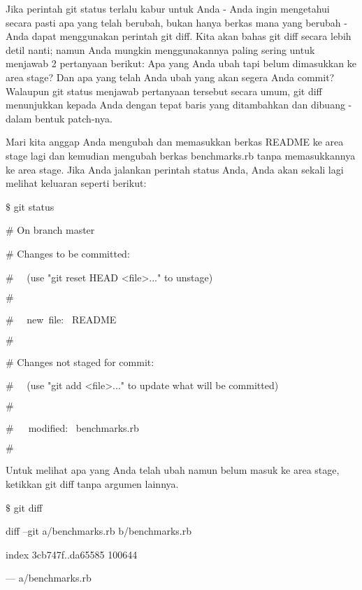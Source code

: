  \par
\noindent 
Jika perintah $  $git status $  $terlalu kabur untuk Anda - Anda ingin mengetahui secara pasti apa yang telah berubah, bukan hanya berkas mana yang berubah - Anda dapat menggunakan perintah $  $git diff. Kita akan bahas $  $git diff $  $secara lebih detil nanti; namun Anda mungkin menggunakannya paling sering untuk menjawab 2 pertanyaan berikut: Apa yang Anda ubah tapi belum dimasukkan ke area stage? Dan apa yang telah Anda ubah yang akan segera Anda commit? Walaupun $  $git status $  $menjawab pertanyaan tersebut secara umum, $  $git diff $  $menunjukkan kepada Anda dengan tepat baris yang ditambahkan dan dibuang - dalam bentuk patch-nya. \par
\noindent 
Mari kita anggap Anda mengubah dan memasukkan berkas README ke area stage lagi dan kemudian mengubah berkas benchmarks.rb tanpa memasukkannya ke area stage. Jika Anda jalankan perintah $  $status $  $Anda, Anda akan sekali lagi melihat keluaran seperti berikut: \par
\noindent 
 $  \$  $ git status \par
\noindent 
 $  \#  $ On branch master \par
\noindent 
 $  \#  $ Changes to be committed: \par
\noindent 
 $  \#  $~~ (use "git reset HEAD <file>..." to unstage) \par
\noindent 
 $  \#  $ \par
\noindent 
 $  \#  $~~ new~file:~  README \par
\noindent 
 $  \#  $ \par
\noindent 
 $  \#  $ Changes not staged for commit: \par
\noindent 
 $  \#  $~~ (use "git add <file>..." to update what will be committed) \par
\noindent 
 $  \#  $ \par
\noindent 
 $  \#  $~~~modified:~  benchmarks.rb \par
\noindent 
 $  \#  $ \par
\noindent 
Untuk melihat apa yang Anda telah ubah namun belum masuk ke area stage, ketikkan $  $git diff $  $tanpa argumen lainnya. \par
\noindent 
 $  \$  $ git diff \par
\noindent 
diff --git a/benchmarks.rb b/benchmarks.rb \par
\noindent 
index 3cb747f..da65585 100644 \par
\noindent 
--- a/benchmarks.rb \par
